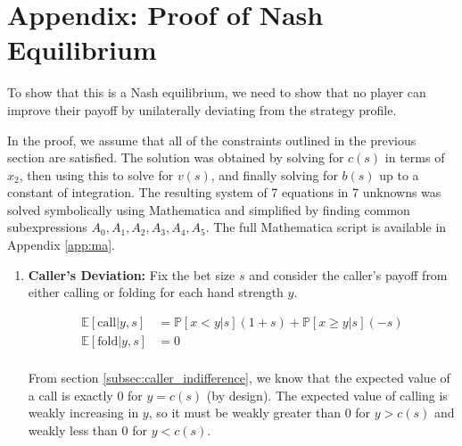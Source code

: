 \documentclass[../../main/main.tex]{subfiles}
\begin{document}
\section{Appendix: Proof of Nash Equilibrium}
\label{app:nash_equilibrium}

\begin{customproof}
    To show that this is a Nash equilibrium, we need to show that no player can improve their payoff by unilaterally deviating from the strategy profile.
    
    In the proof, we assume that all of the constraints outlined in the previous section are satisfied. The solution was obtained by solving for $c(s)$ in terms of $x_2$, then using this to solve for $v(s)$, and finally solving for $b(s)$ up to a constant of integration. The resulting system of 7 equations in 7 unknowns was solved symbolically using Mathematica and simplified by finding common subexpressions $A_0, A_1, A_2, A_3, A_4, A_5$. The full Mathematica script is available in Appendix \ref{app:ma}.

    \begin{enumerate}
        \item \textbf{Caller's Deviation:}
            Fix the bet size $s$ and consider the caller's payoff from either calling or folding for each hand strength $y$. 

            \begin{align*}
                \mathbb{E}[\text{call} | y, s] &= \mathbb{P}[x < y | s](1+s) + \mathbb{P}[x \geq y | s](-s) \\
                \mathbb{E}[\text{fold} | y, s] &= 0 \\
            \end{align*}
            
            From section \ref{subsec:caller_indifference}, we know that the expected value of a call is exactly 0 for $y = c(s)$ (by design). The expected value of calling is weakly increasing in $y$, so it must be weakly greater than 0 for $y > c(s)$ and weakly less than 0 for $y < c(s)$. 

            \begin{figure}[h]
                \centering
\end{figure}
\end{enumerate}
\end{customproof}
\end{document}
